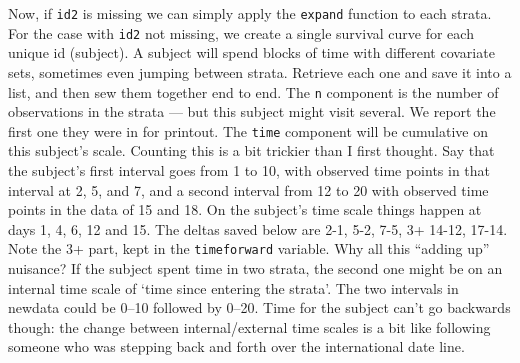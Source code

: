 \documentclass{article}
\newcommand{\code}[1]{\texttt{#1}}
\begin{document}
Now, if \code{id2} is missing we can simply apply the \code{expand} function
to each strata.
For the case with \code{id2} not missing, we create a single survival
curve for each unique id (subject). 
A subject will spend blocks of time with different covariate sets,
sometimes even jumping between strata.  Retrieve each one and save it into
a list, and then sew them together end to end.
The \code{n} component is the number of observations in the strata --- but this
subject might visit several.  We report the first one they were in for
printout.
The \code{time} component will be cumulative on this subject's scale.     %
Counting this is a bit trickier than I first thought.  Say that the
subject's first interval goes from 1 to 10, with observed time points in
that interval at 2, 5, and 7, and a second interval from 12 to 20  with
observed time points in the data of 15 and 18.  On the subject's time
scale things happen at days 1, 4, 6, 12 and 15.  The deltas saved below
are 2-1, 5-2, 7-5, 3+ 14-12, 17-14.  Note the 3+ part, kept 
in the \code{timeforward} variable.
Why all this ``adding up'' nuisance?  If the subject spent time in two
strata, the second one might be on an internal time scale of `time since
entering the strata'.  The two intervals in newdata could be 0--10 followed
by 0--20.  Time for the subject can't go backwards though: the change    %
between internal/external time scales is a bit like following someone who 
was stepping back and forth over the international date line.
\end{document}
